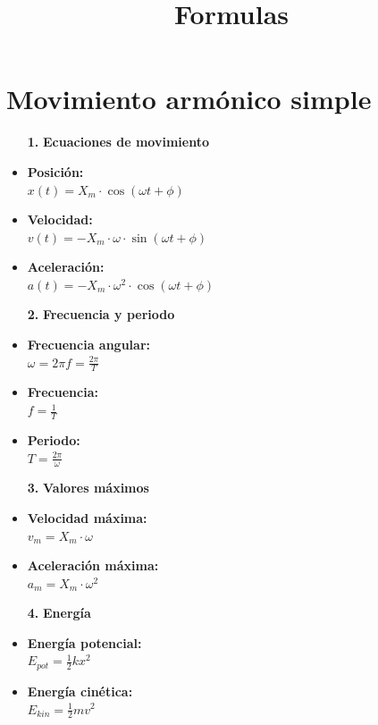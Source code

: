 \documentclass[a4paper,12pt,numbers=noenddot]{scrreprt}
\begin{document}

\title{Formulas}
\section*{Movimiento armónico simple}
\begin{multicols}{2}
\begin{itemize}
    \item[\textbf{1.}] \textbf{\large Ecuaciones de movimiento}
    \item \textbf{Posición:}\\ $x(t) = X_m \cdot \cos(\omega t + \phi)$
    \item \textbf{Velocidad:}\\ $v(t) = -X_m \cdot \omega \cdot \sin(\omega t + \phi)$
    \item \textbf{Aceleración:}\\ $a(t) = -X_m \cdot \omega^2 \cdot \cos(\omega t + \phi)$
    \item[\textbf{2.}] \textbf{\large Frecuencia y periodo}
    \item \textbf{Frecuencia angular:}\\ $\omega = 2\pi f = \frac{2\pi}{T}$
    \item \textbf{Frecuencia:}\\ $f = \frac{1}{T}$
    \item \textbf{Periodo:}\\ $T = \frac{2\pi}{\omega}$
    \item[\textbf{3.}] \textbf{\large Valores máximos}
    \item \textbf{Velocidad máxima:}\\ $v_m = X_m \cdot \omega$
    \item \textbf{Aceleración máxima:}\\ $a_m = X_m \cdot \omega^2$
    \item[\textbf{4.}] \textbf{\large Energía}
    \item \textbf{Energía potencial:}\\ $E_{pot} = \frac{1}{2} k x^2$
    \item \textbf{Energía cinética:}\\ $E_{kin} = \frac{1}{2} m v^2$

\end{itemize}
\end{multicols}
\end{document}

